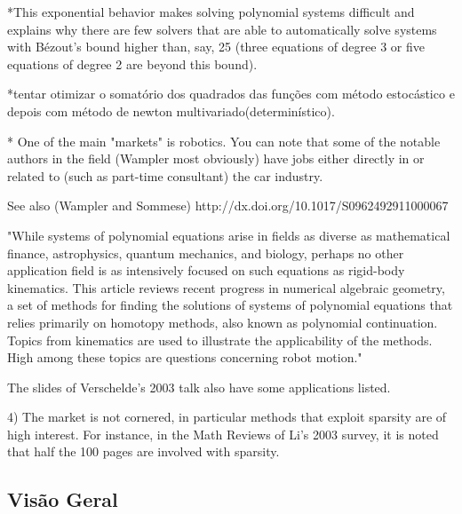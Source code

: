 *This exponential behavior makes solving polynomial systems difficult and explains why there are few solvers that are able to automatically solve systems with Bézout's bound higher than, say, 25 (three equations of degree 3 or five equations of degree 2 are beyond this bound).

*tentar otimizar o somatório dos quadrados das funções com método estocástico e depois com método de newton multivariado(determinístico).

* One of the main "markets" is robotics. You can note that some of the notable authors in the field (Wampler most obviously) have jobs either directly in or related to (such as part-time consultant) the car industry.

See also (Wampler and Sommese) http://dx.doi.org/10.1017/S0962492911000067

"While systems of polynomial equations arise in fields as diverse as mathematical finance, astrophysics, quantum mechanics, and biology, perhaps no other application field is as intensively focused on such equations as rigid-body kinematics. This article reviews recent progress in numerical algebraic geometry, a set of methods for finding the solutions of systems of polynomial equations that relies primarily on homotopy methods, also known as polynomial continuation. Topics from kinematics are used to illustrate the applicability of the methods. High among these topics are questions concerning robot motion."

The slides of Verschelde's 2003 talk also have some applications listed. %

4) The market is not cornered, in particular methods that exploit sparsity are of high interest. For instance, in the Math Reviews of Li's 2003 survey, it is noted that half the 100 pages are involved with sparsity. %

\subsection{Visão Geral}

